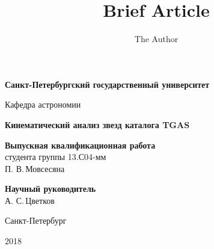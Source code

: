 \documentclass[14pt]{article} %
\title{Brief Article}
\author{The Author}
\begin{document}
\begin{titlepage}

\begin{center}
{\small \bf Санкт-Петербургский государственный университет

Кафедра астрономии}
\end{center}

\vspace{2cm}
\begin{center}
  \large{\bf Кинематический анализ звезд каталога TGAS}
 \end{center}

\vspace{3cm}

\hspace{8cm}\parbox{8cm}{	%

\footnotesize{{\bf Выпускная квалификационная работа}\\
студента группы 13.С04-мм\\
П. В.\,Мовсесяна}  %

\vspace{1cm}

{\bf Научный руководитель}\\
А. С.\,Цветков \\  %
}


\vfill %

\begin{center}
\small {Санкт-Петербург

2018}
\end{center}

\end{titlepage}
\end{document}
